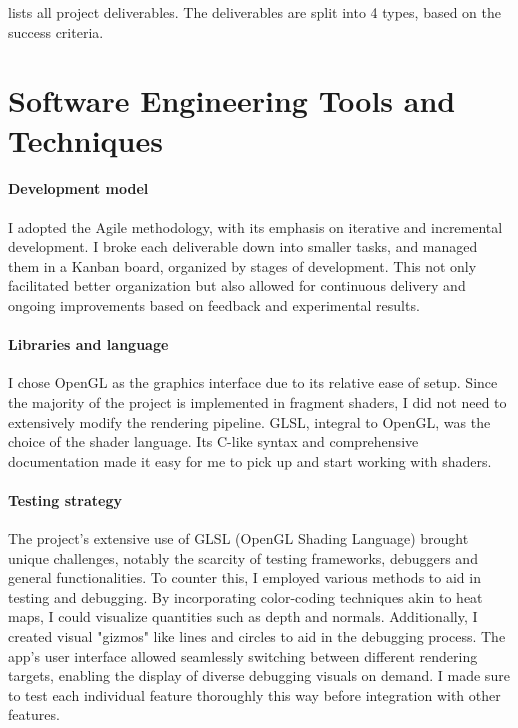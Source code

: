 {lists all project deliverables. The deliverables are split into 4 types, based on the success criteria.}

\section{Software Engineering Tools and Techniques}
\label{sec:Software Engineering}

\paragraph{Development model}
I adopted the Agile methodology, with its emphasis on iterative and incremental development. I broke each deliverable down into smaller tasks, and managed them in a Kanban board, organized by stages of development. This not only facilitated better organization but also allowed for continuous delivery and ongoing improvements based on feedback and experimental results.

\paragraph{Libraries and language}
I chose OpenGL as the graphics interface due to its relative ease of setup. Since the majority of the project is implemented in fragment shaders, I did not need to extensively modify the rendering pipeline. GLSL, integral to OpenGL, was the choice of the shader language. Its C-like syntax and comprehensive documentation made it easy for me to pick up and start working with shaders.

\paragraph{Testing strategy}
The project's extensive use of GLSL (OpenGL Shading Language) brought unique challenges, notably the scarcity of testing frameworks, debuggers and general functionalities. To counter this, I employed various methods to aid in testing and debugging. By incorporating color-coding techniques akin to heat maps, I could visualize quantities such as depth and normals. Additionally, I created visual "gizmos" like lines and circles to aid in the debugging process. The app's user interface allowed seamlessly switching between different rendering targets, enabling the display of diverse debugging visuals on demand. I made sure to test each individual feature thoroughly this way before integration with other features.

